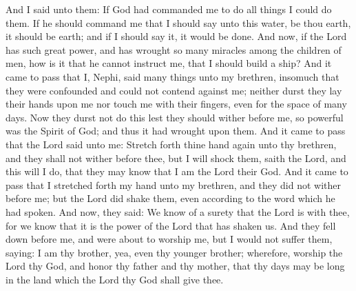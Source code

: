 And I said unto them: If God had commanded me to do all things I could do them. If he should command me that I should say unto this water, be thou earth, it should be earth; and if I should say it, it would be done.
\bverse \iffalse And now, if the Lord has such great power, and has wrought so many miracles among the children of men, how is it that he cannot instruct me, that I should build a ship? \fi
And now, if the Lord has such great power, and has wrought so many miracles among the children of men, how is it that he cannot instruct me, that I should build a ship?
\bverse \iffalse And it came to pass that I, Nephi, said many things unto my brethren, insomuch that they were confounded and could not contend against me; neither durst they lay their hands upon me nor touch me with their fingers, even for the space of many days.  Now they durst not do this lest they should wither before me, so powerful was the Spirit of God; and thus it had wrought upon them. \fi
And it came to pass that I, Nephi, said many things unto my brethren, insomuch that they were confounded and could not contend against me; neither durst they lay their hands upon me nor touch me with their fingers, even for the space of many days.  Now they durst not do this lest they should wither before me, so powerful was the Spirit of God; and thus it had wrought upon them.
\bverse \iffalse And it came to pass that the Lord said unto me: Stretch forth thine hand again unto thy brethren, and they shall not wither before thee, but I will shock them, saith the Lord, and this will I do, that they may know that I am the Lord their God. \fi
And it came to pass that the Lord said unto me: Stretch forth thine hand again unto thy brethren, and they shall not wither before thee, but I will shock them, saith the Lord, and this will I do, that they may know that I am the Lord their God.
\bverse \iffalse And it came to pass that I stretched forth my hand unto my brethren, and they did not wither before me; but the Lord did shake them, even according to the word which he had spoken. \fi
And it came to pass that I stretched forth my hand unto my brethren, and they did not wither before me; but the Lord did shake them, even according to the word which he had spoken.
\bverse \iffalse And now, they said: We know of a surety that the Lord is with thee, for we know that it is the power of the Lord that has shaken us. And they fell down before me, and were about to worship me, but I would not suffer them, saying: I am thy brother, yea, even thy younger brother; wherefore, worship the Lord thy God, and honor thy father and thy mother, that thy days may be long in the land which the Lord thy God shall give thee. \fi
And now, they said: We know of a surety that the Lord is with thee, for we know that it is the power of the Lord that has shaken us. And they fell down before me, and were about to worship me, but I would not suffer them, saying: I am thy brother, yea, even thy younger brother; wherefore, worship the Lord thy God, and honor thy father and thy mother, that thy days may be long in the land which the Lord thy God shall give thee.


